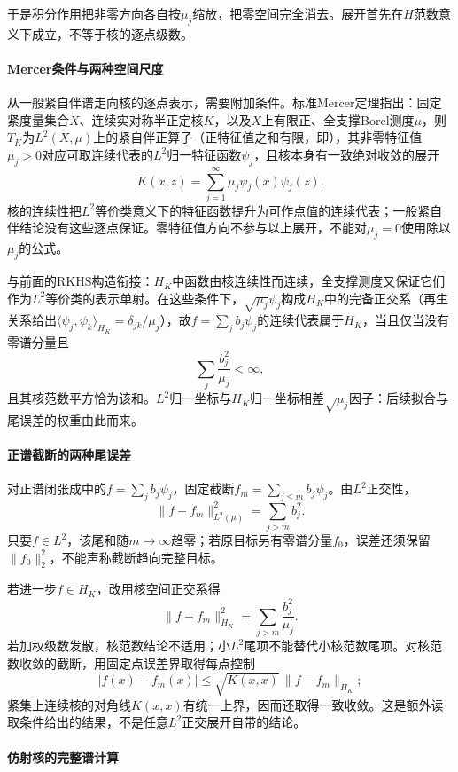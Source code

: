 于是积分作用把非零方向各自按$\mu_j$缩放，把零空间完全消去。展开首先在$H$范数意义下成立，不等于核的逐点级数。

\paragraph{Mercer条件与两种空间尺度}

从一般紧自伴谱走向核的逐点表示，需要附加条件。标准Mercer定理指出：固定紧度量集合$X$、连续实对称半正定核$K$，以及$X$上有限正、全支撑Borel测度$\mu$，则$T_K$为$L^2(X,\mu)$上的紧自伴正算子（正特征值之和有限，即），其非零特征值$\mu_j>0$对应可取连续代表的$L^2$归一特征函数$\psi_j$，且核本身有一致绝对收敛的展开
\begin{equation}
\label{eq:functional-mercer-expansion}
K(x,z)=\sum_{j=1}^\infty\mu_j\psi_j(x)\psi_j(z).
\end{equation}
核的连续性把$L^2$等价类意义下的特征函数提升为可作点值的连续代表；一般紧自伴结论没有这些逐点保证。零特征值方向不参与以上展开，不能对$\mu_j=0$使用除以$\mu_j$的公式。

与前面的RKHS构造衔接：$H_K$中函数由核连续性而连续，全支撑测度又保证它们作为$L^2$等价类的表示单射。在这些条件下，$\sqrt{\mu_j}\psi_j$构成$H_K$中的完备正交系（再生关系给出$\langle\psi_j,\psi_k\rangle_{H_K}=\delta_{jk}/\mu_j$），故$f=\sum_jb_j\psi_j$的连续代表属于$H_K$，当且仅当没有零谱分量且
\[
\sum_j\frac{b_j^2}{\mu_j}<\infty,
\]
且其核范数平方恰为该和。$L^2$归一坐标与$H_K$归一坐标相差$\sqrt{\mu_j}$因子：后续拟合与尾误差的权重由此而来。

\paragraph{正谱截断的两种尾误差}

对正谱闭张成中的$f=\sum_jb_j\psi_j$，固定截断$f_m=\sum_{j\le m}b_j\psi_j$。由$L^2$正交性，
\[
\|f-f_m\|_{L^2(\mu)}^2=\sum_{j>m}b_j^2.
\]
只要$f\in L^2$，该尾和随$m\to\infty$趋零；若原目标另有零谱分量$f_0$，误差还须保留$\|f_0\|_2^2$，不能声称截断趋向完整目标。

若进一步$f\in H_K$，改用核空间正交系得
\[
\|f-f_m\|_{H_K}^2=\sum_{j>m}\frac{b_j^2}{\mu_j}.
\]
若加权级数发散，核范数结论不适用；小$L^2$尾项不能替代小核范数尾项。对核范数收敛的截断，用固定点误差界取得每点控制
\[
|f(x)-f_m(x)|\le\sqrt{K(x,x)}\,\|f-f_m\|_{H_K};
\]
紧集上连续核的对角线$K(x,x)$有统一上界，因而还取得一致收敛。这是额外读取条件给出的结果，不是任意$L^2$正交展开自带的结论。

\paragraph{仿射核的完整谱计算}

